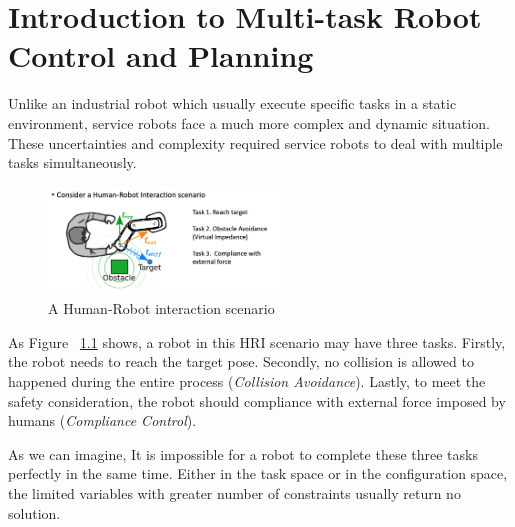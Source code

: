 \chapter{Introduction to Multi-task Robot Control and Planning}
Unlike an industrial robot which usually execute specific tasks in a static environment, service robots face a much more complex and dynamic situation. These uncertainties and complexity required service robots to deal with multiple tasks simultaneously.
\begin{figure}
\centering
\includegraphics[width=0.55\textwidth]{images/motivation_scenario.png}
\caption{A Human-Robot interaction scenario}
\label{fig:Human-Robot interaction scenario}
\end{figure}

As Figure ~\ref{fig:Human-Robot interaction scenario} shows, a robot in this HRI scenario may have three tasks. Firstly, the robot needs to reach the target pose. Secondly, no collision is allowed to happened during the entire process (\textit{Collision Avoidance}). Lastly, to meet the safety consideration, the robot should compliance with external force imposed by humans (\textit{Compliance Control}).
 
As we can imagine, It is impossible for a robot to complete these three tasks perfectly in the same time. Either in the task space or in the configuration space, the limited variables with greater number of constraints usually return no solution. 

